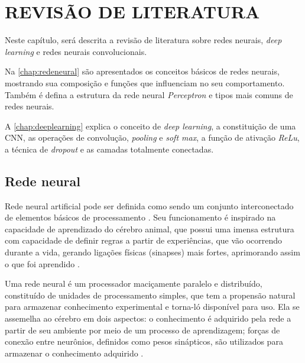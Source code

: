 
\chapter{REVISÃO DE LITERATURA}
\label{chap:fundamentacaoTeorica}

Neste capítulo, será descrita a revisão de literatura sobre redes neurais, \textit{deep learning} e redes neurais convolucionais.
\par Na \autoref{chap:redeneural} são apresentados os conceitos básicos de redes neurais, mostrando sua composição e funções que influenciam no seu comportamento. Também é defina a estrutura da rede neural \textit{Perceptron} e tipos mais comuns de redes neurais.
\par A \autoref{chap:deeplearning} explica o conceito de \textit{deep learning}, a constituição de uma CNN, as operações de convolução, \textit{pooling} e \textit{soft max}, a função de ativação \textit{ReLu}, a técnica de \textit{dropout} e as camadas totalmente conectadas.  

\section{Rede neural}
\label{chap:redeneural}
Rede neural artificial pode ser definida como sendo um conjunto interconectado de elementos básicos de processamento \cite{Gurney1997}. Seu funcionamento é inspirado na capacidade de aprendizado do cérebro animal, que possui uma imensa estrutura com capacidade de definir regras a partir de experiências, que vão ocorrendo durante a vida, gerando ligações físicas (sinapses) mais fortes, aprimorando assim o que foi aprendido \cite{haykin2001}.
\begin{citacao}
  Uma rede neural é um processador maciçamente paralelo e distribuído, constituído de unidades de processamento simples, que tem a propensão natural para armazenar conhecimento experimental e torna-ló disponível para uso. Ela se assemelha ao cérebro em dois aspectos: o conhecimento é adquirido pela rede a partir de seu ambiente por meio de um processo de aprendizagem; forças de conexão entre neurônios, definidos como pesos sinápticos, são utilizados para armazenar o conhecimento adquirido \cite{haykin2001}.
\end{citacao}

